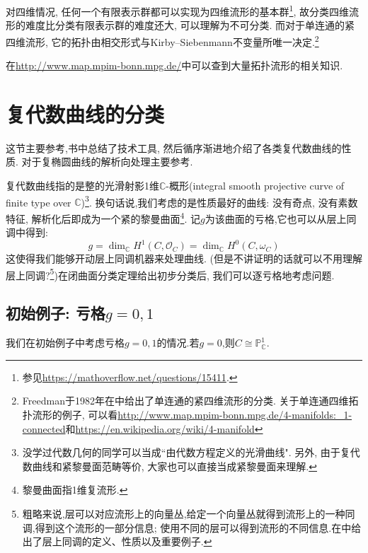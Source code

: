 \documentclass[UTF8,12pt,twoside]{article}
\theoremstyle{definition}
\newcommand{\CC}{\mathbb{C}}  %
\numberwithin{equation}{section}
\begin{document}
对四维情况, 任何一个有限表示群都可以实现为四维流形的基本群\footnote{参见\url{https://mathoverflow.net/questions/15411}.}, 故分类四维流形的难度比分类有限表示群的难度还大, 可以理解为不可分类. 而对于单连通的紧四维流形, 它的拓扑由相交形式与Kirby–Siebenmann不变量所唯一决定.\footnote{Freedman于1982年在\cite[Theorem 1.5]{freedman1982topology}中给出了单连通的紧四维流形的分类. 关于单连通四维拓扑流形的例子, 可以看\url{http://www.map.mpim-bonn.mpg.de/4-manifolds:_1-connected}和\url{https://en.wikipedia.org/wiki/4-manifold}}%

在\url{http://www.map.mpim-bonn.mpg.de/}中可以查到大量拓扑流形的相关知识.

\section{复代数曲线的分类}
这节主要参考\cite[Chapter 19]{vakil2017rising},书中总结了技术工具, 然后循序渐进地介绍了各类复代数曲线的性质. 对于复椭圆曲线的解析向处理主要参考\cite[第八章]{Li2019modularform}.

复代数曲线指的是整的光滑射影1维$\CC$-概形(integral smooth projective curve of finite type over $\CC$)\footnote{没学过代数几何的同学可以当成``由代数方程定义的光滑曲线". 另外, 由于复代数曲线和紧黎曼面范畴等价, 大家也可以直接当成紧黎曼面来理解.}. 换句话说,我们考虑的是性质最好的曲线: 没有奇点, 没有素数特征, 解析化后即成为一个紧的黎曼曲面\footnote{黎曼曲面指1维复流形.}. 记$g$为该曲面的亏格,它也可以从层上同调中得到: 
$$g=\dim_{\mathbb{C}}H^1(C,\mathcal{O}_C)=\dim_{\mathbb{C}}H^0(C,\omega_C)$$
这使得我们能够开动层上同调机器来处理曲线. (但是不讲证明的话就可以不用理解层上同调?\footnote{粗略来说,层可以对应流形上的向量丛,给定一个向量丛就得到流形上的一种同调,得到这个流形的一部分信息;      使用不同的层可以得到流形的不同信息.在\cite[Chapter 18]{vakil2017rising}中给出了层上同调的定义、性质以及重要例子.})在闭曲面分类定理给出初步分类后, 我们可以逐亏格地考虑问题.

\subsection{初始例子: 亏格$g=0,1$}
我们在初始例子中考虑亏格$g=0,1$的情况.若$g=0$,则$C \cong \mathbb{P}_{\CC}^1$.
\end{document}
